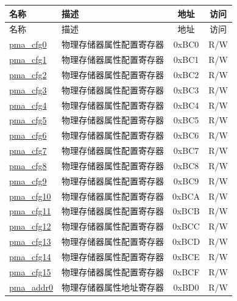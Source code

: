 \begin{longtable}{ | p{4.0cm} | p{8.4cm} | c | c| }
\hline\rowcolor{lightgray}
名称 & 描述 & 地址 & 访问 \\ \hline
\endfirsthead
\hline
\rowcolor{lightgray}
名称 & 描述 & 地址 & 访问  \\
\hline
\endhead
\endfoot

\hyperref[sec:riscvcpu-pma-reg-desc]{pma\_cfg0} & 物理存储器属性配置寄存器 & 0xBC0 & R/W \\\hline
\hyperref[sec:riscvcpu-pma-reg-desc]{pma\_cfg1} & 物理存储器属性配置寄存器 & 0xBC1 & R/W \\\hline
\hyperref[sec:riscvcpu-pma-reg-desc]{pma\_cfg2} & 物理存储器属性配置寄存器 & 0xBC2 & R/W \\\hline
\hyperref[sec:riscvcpu-pma-reg-desc]{pma\_cfg3} & 物理存储器属性配置寄存器 & 0xBC3 & R/W \\\hline
\hyperref[sec:riscvcpu-pma-reg-desc]{pma\_cfg4} & 物理存储器属性配置寄存器 & 0xBC4 & R/W \\\hline
\hyperref[sec:riscvcpu-pma-reg-desc]{pma\_cfg5} & 物理存储器属性配置寄存器 & 0xBC5 & R/W \\\hline
\hyperref[sec:riscvcpu-pma-reg-desc]{pma\_cfg6} & 物理存储器属性配置寄存器 & 0xBC6 & R/W \\\hline
\hyperref[sec:riscvcpu-pma-reg-desc]{pma\_cfg7} & 物理存储器属性配置寄存器 & 0xBC7 & R/W \\\hline
\hyperref[sec:riscvcpu-pma-reg-desc]{pma\_cfg8} & 物理存储器属性配置寄存器 & 0xBC8 & R/W \\\hline
\hyperref[sec:riscvcpu-pma-reg-desc]{pma\_cfg9} & 物理存储器属性配置寄存器 & 0xBC9 & R/W \\\hline
\hyperref[sec:riscvcpu-pma-reg-desc]{pma\_cfg10} & 物理存储器属性配置寄存器 & 0xBCA & R/W \\\hline
\hyperref[sec:riscvcpu-pma-reg-desc]{pma\_cfg11} & 物理存储器属性配置寄存器 & 0xBCB & R/W \\\hline
\hyperref[sec:riscvcpu-pma-reg-desc]{pma\_cfg12} & 物理存储器属性配置寄存器 & 0xBCC & R/W \\\hline
\hyperref[sec:riscvcpu-pma-reg-desc]{pma\_cfg13} & 物理存储器属性配置寄存器 & 0xBCD & R/W \\\hline
\hyperref[sec:riscvcpu-pma-reg-desc]{pma\_cfg14} & 物理存储器属性配置寄存器 & 0xBCE & R/W \\\hline
\hyperref[sec:riscvcpu-pma-reg-desc]{pma\_cfg15} & 物理存储器属性配置寄存器 & 0xBCF & R/W \\\hline
\hyperref[sec:riscvcpu-pma-reg-desc]{pma\_addr0} & 物理存储器属性地址寄存器 & 0xBD0 & R/W \\\hline

\end{longtable}
